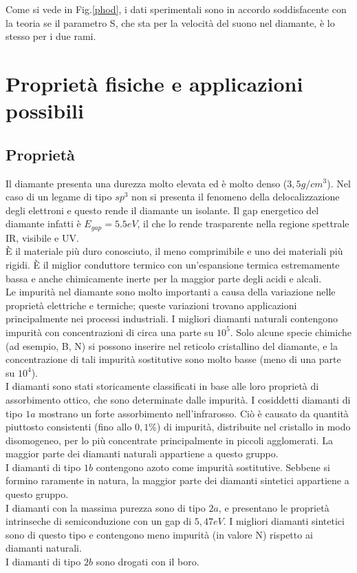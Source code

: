 \documentclass[a4paper,titlepage]{book}
\begin{document}
Come si vede in Fig.\ref{phod}, i dati sperimentali sono in accordo soddisfacente con la teoria se il parametro S, che sta per la velocità del suono nel diamante, è lo stesso per i due rami.

\section{Proprietà fisiche e applicazioni possibili}
\subsection{Proprietà}
Il diamante presenta una durezza molto elevata ed è molto denso ($3,5 g / cm^3$). Nel caso di un legame di tipo $sp^3$ non si presenta il fenomeno della delocalizzazione degli elettroni e questo rende il diamante un isolante. Il gap energetico del diamante infatti è $E_{gap} = 5.5 eV$, il che lo rende trasparente nella regione spettrale IR, visibile e UV.\\
È il materiale più duro conosciuto, il meno comprimibile e uno dei materiali più rigidi. È il miglior conduttore termico con un'espansione termica estremamente bassa e anche chimicamente inerte per la maggior parte degli acidi e alcali.\\
Le impurità nel diamante sono molto importanti a causa della variazione nelle proprietà elettriche e termiche; queste variazioni trovano applicazioni principalmente nei processi industriali. I migliori diamanti naturali contengono impurità con concentrazioni di circa una parte su $10^5$. Solo alcune specie chimiche (ad esempio, B, N) si possono inserire nel reticolo cristallino del diamante, e la concentrazione di tali impurità sostitutive sono molto basse (meno di una parte su $10^4$).\\
I diamanti sono stati storicamente classificati in base alle loro proprietà di assorbimento ottico, che sono determinate dalle impurità. I cosiddetti diamanti di tipo $1a$ mostrano un forte assorbimento nell'infrarosso. Ciò è causato da quantità piuttosto consistenti (fino allo $0,1\%$) di impurità, distribuite nel cristallo in modo disomogeneo, per lo più concentrate principalmente in piccoli agglomerati. La maggior parte dei diamanti naturali appartiene a questo gruppo.\\
I diamanti di tipo $1b$ contengono azoto come impurità sostitutive. Sebbene si formino raramente in natura, la maggior parte dei diamanti sintetici appartiene a questo gruppo.\\
I diamanti con la massima purezza sono di tipo $2a$, e presentano le proprietà intrinseche di semiconduzione con un gap di $5,47 eV$. I migliori diamanti sintetici sono di questo tipo e contengono meno impurità (in valore N) rispetto ai diamanti naturali.\\
I diamanti di tipo $2b$ sono drogati con il boro.\\
\end{document}
